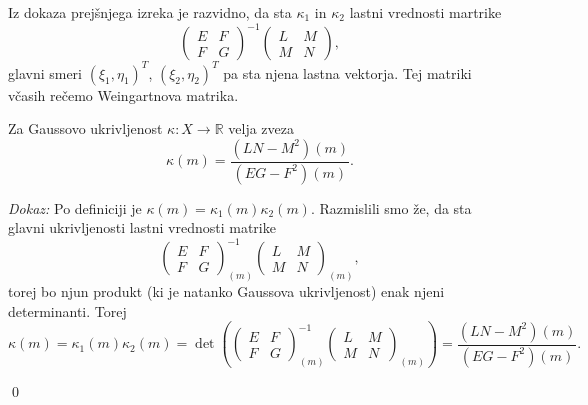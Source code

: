 Iz dokaza prejšnjega izreka je razvidno, da sta $\kappa_1$ in $\kappa_2$ lastni vrednosti martrike \begin{equation*}
  \begin{pmatrix}
  E & F \\
  F & G
  \end{pmatrix}^{-1}\begin{pmatrix}
  L & M \\
  M & N
  \end{pmatrix},
\end{equation*}  
  glavni smeri $(\xi_1, \eta_1)^{T}$, $(\xi_2, \eta_2)^{T}$ pa sta njena lastna vektorja. Tej matriki včasih rečemo
  Weingartnova matrika.


\begin{izrek}
\label{izr_izrazava_gaussove_ukrivljenosti}
Za Gaussovo ukrivljenost $\kappa: X \to  \mathbb{R}$ velja zveza \begin{equation*}
\kappa(m) = \frac{(LN - M^2)(m)}{(EG - F^2)(m)}. 
\end{equation*}  
\end{izrek}

\noindent
{\em Dokaz:\/}
Po definiciji je $\kappa(m) = \kappa_1(m) \kappa_2(m)$. Razmislili smo že, da sta glavni ukrivljenosti
lastni vrednosti matrike \begin{equation*}
  \begin{pmatrix}
    E & F \\
    F & G
    \end{pmatrix}_{(m)}^{-1}\begin{pmatrix}
    L & M \\
    M & N
    \end{pmatrix}_{(m)},
\end{equation*}  
  torej bo njun produkt (ki je natanko Gaussova ukrivljenost) enak njeni determinanti. Torej \begin{equation*}
    \kappa(m) = \kappa_1(m) \kappa_2(m) = \det \left(  \begin{pmatrix}
      E & F \\
      F & G
      \end{pmatrix}_{(m)}^{-1}\begin{pmatrix}
      L & M \\
      M & N
      \end{pmatrix}_{(m)} \right) = \frac{(LN - M^2)(m)}{(EG - F^2)(m)}.
  \end{equation*}  
    
\qed

